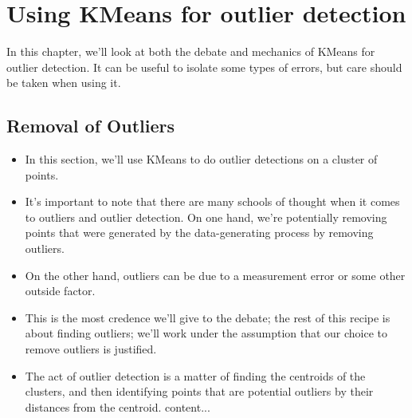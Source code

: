 \documentclass[SKL-MASTER.tex]{subfiles}
\begin{document}
	\Large
\section*{Using KMeans for outlier detection}
In this chapter, we'll look at both the debate and mechanics of KMeans for outlier detection.
It can be useful to isolate some types of errors, but care should be taken when using it.
\subsection*{Removal of Outliers} 
\begin{itemize}
\item In this section, we'll use KMeans to do outlier detections on a cluster of points. 
\item It's important
to note that there are many schools of thought when it comes to outliers and outlier detection. On one
hand, we're potentially removing points that were generated by the data-generating process
by removing outliers. 
\item On the other hand, outliers can be due to a measurement error or some
other outside factor.
\item This is the most credence we'll give to the debate; the rest of this recipe is about finding outliers;
we'll work under the assumption that our choice to remove outliers is justified.
\item The act of outlier detection is a matter of finding the centroids of the clusters, and then
identifying points that are potential outliers by their distances from the centroid.	content...
\end{itemize}
\end{document}
